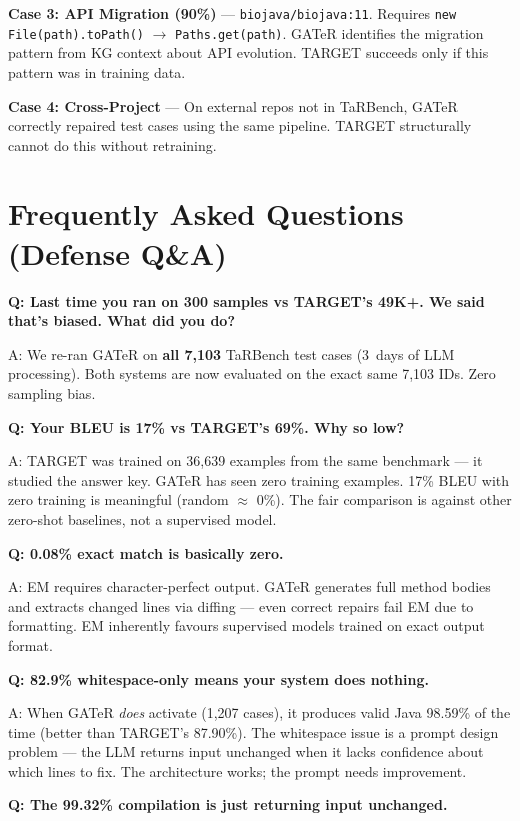 \documentclass[11pt,a4paper]{article}
\begin{document}
\textbf{Case 3: API Migration (90\%)} ---
\texttt{biojava/biojava:11}.  Requires \texttt{new File(path).toPath()}
$\to$ \texttt{Paths.get(path)}.  GATeR identifies the migration pattern
from KG context about API evolution.  TARGET succeeds only if this
pattern was in training data.

\textbf{Case 4: Cross-Project} ---
On external repos not in TaRBench, GATeR correctly repaired test cases
using the same pipeline.  TARGET structurally cannot do this without
retraining.

\section{Frequently Asked Questions (Defense Q\&A)}

\textbf{Q: Last time you ran on 300 samples vs TARGET's 49K+.
We said that's biased.  What did you do?}

A: We re-ran GATeR on \textbf{all 7,103} TaRBench test cases (3~days
of LLM processing).  Both systems are now evaluated on the exact same
7,103 IDs.  Zero sampling bias.

\textbf{Q: Your BLEU is 17\% vs TARGET's 69\%.  Why so low?}

A: TARGET was trained on 36,639 examples from the same benchmark ---
it studied the answer key.  GATeR has seen zero training examples.
17\% BLEU with zero training is meaningful (random $\approx$ 0\%).
The fair comparison is against other zero-shot baselines, not a
supervised model.

\textbf{Q: 0.08\% exact match is basically zero.}

A: EM requires character-perfect output.  GATeR generates full method
bodies and extracts changed lines via diffing --- even correct repairs
fail EM due to formatting.  EM inherently favours supervised models
trained on exact output format.

\textbf{Q: 82.9\% whitespace-only means your system does nothing.}

A: When GATeR \textit{does} activate (1,207 cases), it produces valid
Java 98.59\% of the time (better than TARGET's 87.90\%).
The whitespace issue is a prompt design problem --- the LLM returns
input unchanged when it lacks confidence about which lines to fix.
The architecture works; the prompt needs improvement.

\textbf{Q: The 99.32\% compilation is just returning input unchanged.}
\end{document}
